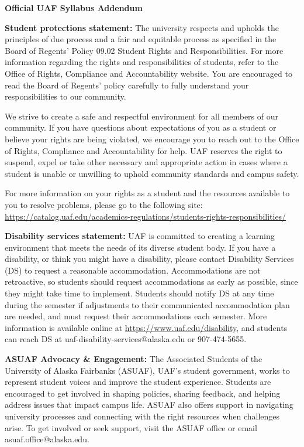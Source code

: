 \documentclass[11pt]{article}
\renewcommand{\emph}[1]{\textsf{\textbf{#1}}}
\newcommand{\localhead}[1]{\par\smallskip\textbf{#1} \smallskip\nobreak\\}%
\def\heading#1{\localhead{\large\emph{#1}}}
\begin{document}
\begin{center}
\heading{Official UAF Syllabus Addendum}
\end{center}


\noindent\emph{Student protections statement:} The university respects and upholds the principles of due process and a fair and equitable process as specified in the Board of Regents' Policy 09.02 Student Rights and Responsibilities. For more information regarding the rights and responsibilities of students, refer to the Office of Rights, Compliance and Accountability website. You are encouraged to read the Board of Regents' policy carefully to fully understand your responsibilities to our community.

We strive to create a safe and respectful environment for all members of our community. If you have questions about expectations of you as a student or believe your rights are being violated, we encourage you to reach out to the  Office of Rights, Compliance and Accountability for help. UAF reserves the right to suspend, expel or take other necessary and appropriate action in cases where a student is unable or unwilling to uphold community standards and campus safety.

For more information on your rights as a student and the resources available to you to resolve problems, please go to the following site:\\ \url{https://catalog.uaf.edu/academics-regulations/students-rights-responsibilities/}

\noindent\emph{Disability services statement:}  UAF is committed to creating a learning environment that meets the needs of its diverse student body.  If you have a disability, or think you might have a disability, please contact Disability Services (DS) to request a reasonable accommodation.  Accommodations are not retroactive, so students should request accommodations as early as possible, since they might take time to implement.  Students should notify DS at any time during the semester if adjustments to their communicated accommodation plan are needed, and must request their accommodations each semester.  More information is available online at \url{https://www.uaf.edu/disability}, and students can reach DS at uaf-disability-services@alaska.edu or 907-474-5655.


\noindent\emph{ASUAF Advocacy \& Engagement:} The Associated Students of the University of Alaska Fairbanks (ASUAF), UAF's student government, works to represent student voices and improve the student experience. Students are encouraged to get involved in shaping policies, sharing feedback, and helping address issues that impact campus life. ASUAF also offers support in navigating university processes and connecting with the right resources when challenges arise. To get involved or seek support, visit the ASUAF office or email asuaf.office@alaska.edu. 
\end{document}
